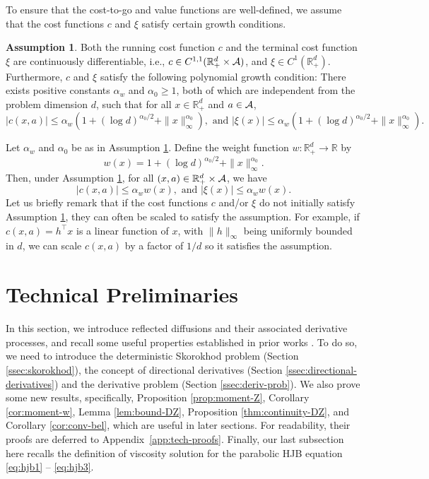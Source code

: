 \documentclass[11pt]{article}
\theoremstyle{definition}
\newtheorem{assumption}{Assumption}[section]
\theoremstyle{plain}
\newcommand{\R}{\mathbb{R}}
\newcommand{\cA}{{\cal A}}
\begin{document}
To ensure that the cost-to-go and value functions are well-defined, we assume that the cost functions $c$ and $\xi$ satisfy certain growth conditions. 
\begin{assumption}\label{as:cost-poly}
Both the running cost function $c$ and the terminal cost function $\xi$ are continuously differentiable, i.e., $c \in C^{1,1}(\R_+^d \times \cA)$, and $\xi \in C^1(\R_+^d)$.
Furthermore, $c$ and $\xi$ satisfy the following polynomial growth condition: 
There exists positive constants $\alpha_w$ and $\alpha_0 \geq 1$,  
both of which are independent from the problem dimension $d$, 
such that for all $x \in \R_+^d$ and $a \in \cA$, 
\begin{equation}\label{eq:c-xi-poly}
|c(x, a)| \le \alpha_w \left(1+(\log d)^{\alpha_0/2} + \|x\|_\infty^{\alpha_0}\right), \text{ and }
|\xi(x)| \le \alpha_w \left(1+(\log d)^{\alpha_0/2} + \|x\|_\infty^{\alpha_0}\right).
\end{equation}
\end{assumption}
Let $\alpha_w$ and $\alpha_0$ be as in Assumption \ref{as:cost-poly}. 
Define the weight function $w : \R_+^d \to \R$ by
\begin{equation}\label{eq:w}
w(x) = 1+(\log d)^{\alpha_0/2} + \|x\|_\infty^{\alpha_0}.
\end{equation}
Then, under Assumption \ref{as:cost-poly}, for all $(x, a) \in \R_+^d \times \cA$, we have
\begin{equation}\label{eq:c-xi-w}
|c(x, a)|\le \alpha_w w(x), \text{ and } |\xi(x)| \le \alpha_w w(x).
\end{equation}
Let us briefly remark that if the cost functions $c$ and/or $\xi$ do not initially satisfy Assumption \ref{as:cost-poly}, they can often be scaled to satisfy the assumption. 
For example, if $c(x,a) = h^\top x$ is a linear function of $x$, with $\|h\|_\infty$ being uniformly bounded in $d$, we can scale $c(x,a)$ 
by a factor of $1/d$ so it satisfies the assumption. 

\section{Technical Preliminaries}\label{sec:tech}

In this section, we introduce reflected diffusions and their associated derivative processes, 
and recall some useful properties established in prior works \cite{LipshutzRamanan2018,LipshutzRamanan2019a,LipshutzRamanan2019b}. 
To do so, we need to introduce the deterministic Skorokhod problem (Section \ref{ssec:skorokhod}), 
the concept of directional derivatives (Section \ref{ssec:directional-derivatives}) and
the derivative problem (Section \ref{ssec:deriv-prob}). 
We also prove some new results, specifically, Proposition \ref{prop:moment-Z}, Corollary \ref{cor:moment-w}, Lemma \ref{lem:bound-DZ}, 
Proposition \ref{thm:continuity-DZ}, and Corollary \ref{cor:conv-bel}, 
which are useful in later sections. 
For readability, their proofs are deferred to Appendix~\ref{app:tech-proofs}.
Finally, our last subsection here recalls the definition of viscosity solution for the parabolic HJB equation \eqref{eq:hjb1} -- \eqref{eq:hjb3}.
\end{document}
